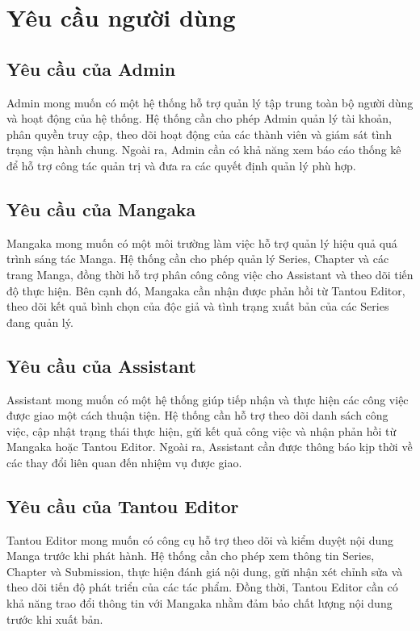 

\section{Yêu cầu người dùng}
\label{sec:yeu_cau_nguoi_dung}

\subsection{Yêu cầu của Admin}
\label{subsec:yeu_cau_admin}
Admin mong muốn có một hệ thống hỗ trợ quản lý tập trung toàn bộ người dùng và hoạt động của hệ thống. Hệ thống cần cho phép Admin quản lý tài khoản, phân quyền truy cập, theo dõi hoạt động của các thành viên và giám sát tình trạng vận hành chung. Ngoài ra, Admin cần có khả năng xem báo cáo thống kê để hỗ trợ công tác quản trị và đưa ra các quyết định quản lý phù hợp.

\subsection{Yêu cầu của Mangaka}
\label{subsec:yeu_cau_mangaka}
Mangaka mong muốn có một môi trường làm việc hỗ trợ quản lý hiệu quả quá trình sáng tác Manga. Hệ thống cần cho phép quản lý Series, Chapter và các trang Manga, đồng thời hỗ trợ phân công công việc cho Assistant và theo dõi tiến độ thực hiện. Bên cạnh đó, Mangaka cần nhận được phản hồi từ Tantou Editor, theo dõi kết quả bình chọn của độc giả và tình trạng xuất bản của các Series đang quản lý.

\subsection{Yêu cầu của Assistant}
\label{subsec:yeu_cau_assistant}
Assistant mong muốn có một hệ thống giúp tiếp nhận và thực hiện các công việc được giao một cách thuận tiện. Hệ thống cần hỗ trợ theo dõi danh sách công việc, cập nhật trạng thái thực hiện, gửi kết quả công việc và nhận phản hồi từ Mangaka hoặc Tantou Editor. Ngoài ra, Assistant cần được thông báo kịp thời về các thay đổi liên quan đến nhiệm vụ được giao.

\subsection{Yêu cầu của Tantou Editor}
\label{subsec:yeu_cau_tantou}
Tantou Editor mong muốn có công cụ hỗ trợ theo dõi và kiểm duyệt nội dung Manga trước khi phát hành. Hệ thống cần cho phép xem thông tin Series, Chapter và Submission, thực hiện đánh giá nội dung, gửi nhận xét chỉnh sửa và theo dõi tiến độ phát triển của các tác phẩm. Đồng thời, Tantou Editor cần có khả năng trao đổi thông tin với Mangaka nhằm đảm bảo chất lượng nội dung trước khi xuất bản.

